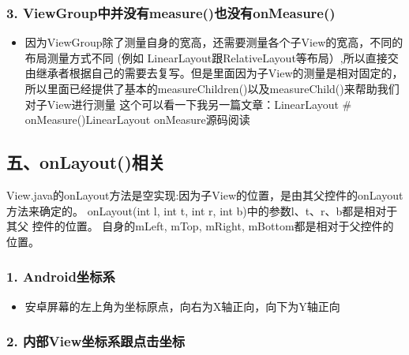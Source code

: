 \documentclass[9pt, b5paper]{article}
\begin{document}
\subsubsection{3. ViewGroup中并没有measure()也没有onMeasure()}
\label{sec-1-4-3}
\begin{itemize}
\item 因为ViewGroup除了测量自身的宽高，还需要测量各个子View的宽高，不同的布局测量方式不同 (例如 LinearLayout跟RelativeLayout等布局）,所以直接交由继承者根据自己的需要去复写。但是里面因为子View的测量是相对固定的，所以里面已经提供了基本的measureChildren()以及measureChild()来帮助我们对子View进行测量 这个可以看一下我另一篇文章：LinearLayout \# onMeasure()LinearLayout onMeasure源码阅读
\end{itemize}

\subsection{五、onLayout()相关}
\label{sec-1-5}
View.java的onLayout方法是空实现:因为子View的位置，是由其父控件的onLayout方法来确定的。
onLayout(int l, int t, int r, int b)中的参数l、t、r、b都是相对于其父 控件的位置。
自身的mLeft, mTop, mRight, mBottom都是相对于父控件的位置。
\subsubsection{1. Android坐标系}
\label{sec-1-5-1}
\begin{itemize}
\item 安卓屏幕的左上角为坐标原点，向右为X轴正向，向下为Y轴正向
\end{itemize}
\subsubsection{2. 内部View坐标系跟点击坐标}
\label{sec-1-5-2}
\end{document}
